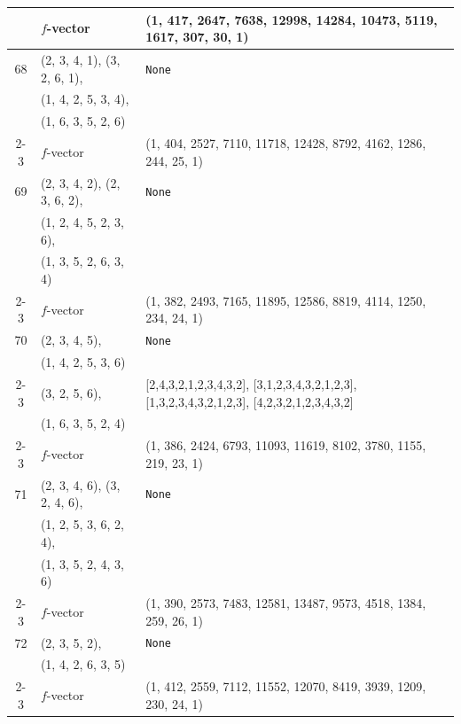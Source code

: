 \documentclass[10pt]{amsart}
\numberwithin{equation}{section}
\theoremstyle{plain}
\theoremstyle{definition}
\theoremstyle{remark}
\begin{document}
{\begin{longtable}{c|l|l}
		& $f$-vector & {(1, 417, 2647, 7638, 12998, 14284, 10473, 5119, 1617, 307, 30, 1)} \\
		\midrule
		
		68 & (2, 3, 4, 1), (3, 2, 6, 1), & \texttt{None} \\
		& (1, 4, 2, 5, 3, 4), &  \\
		& (1, 6, 3, 5, 2, 6) &  \\ \cline{2-3}
		
		& $f$-vector & {(1, 404, 2527, 7110, 11718, 12428, 8792, 4162, 1286, 244, 25, 1)} \\
		\midrule
		
		69 & (2, 3, 4, 2), (2, 3, 6, 2), & \texttt{None} \\
		& (1, 2, 4, 5, 2, 3, 6), &  \\
		& (1, 3, 5, 2, 6, 3, 4) &  \\ \cline{2-3}
		
		& $f$-vector & {(1, 382, 2493, 7165, 11895, 12586, 8819, 4114, 1250, 234, 24, 1)} \\
		\midrule
		
		70 & (2, 3, 4, 5), & \texttt{None} \\
		& (1, 4, 2, 5, 3, 6) &  \\ \cline{2-3}
		
		& (3, 2, 5, 6), & [2,4,3,2,1,2,3,4,3,2], [3,1,2,3,4,3,2,1,2,3], [1,3,2,3,4,3,2,1,2,3], [4,2,3,2,1,2,3,4,3,2] \\
		& (1, 6, 3, 5, 2, 4) &  \\ \cline{2-3}
		
		& $f$-vector & {(1, 386, 2424, 6793, 11093, 11619, 8102, 3780, 1155, 219, 23, 1)} \\
		\midrule
		
		71 & (2, 3, 4, 6), (3, 2, 4, 6), & \texttt{None} \\
		& (1, 2, 5, 3, 6, 2, 4), &  \\
		& (1, 3, 5, 2, 4, 3, 6) &  \\ \cline{2-3}
		
		& $f$-vector & {(1, 390, 2573, 7483, 12581, 13487, 9573, 4518, 1384, 259, 26, 1)} \\
		\midrule
		
		72 & (2, 3, 5, 2), & \texttt{None} \\
		& (1, 4, 2, 6, 3, 5) &  \\ \cline{2-3}
		
		& $f$-vector & {(1, 412, 2559, 7112, 11552, 12070, 8419, 3939, 1209, 230, 24, 1)} \\
		\midrule
		

\end{longtable}}
\end{document}
